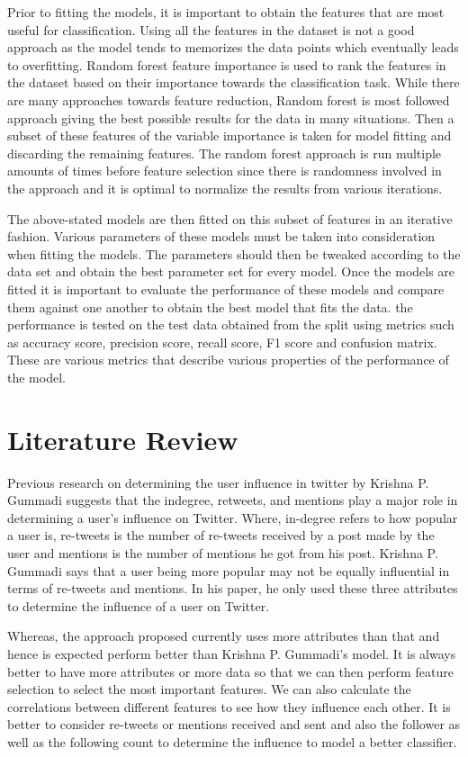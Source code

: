 \documentclass[sigconf]{acmart}
\begin{document}
Prior to fitting the models, it is important to obtain the features that are most useful for classification. Using all the features in the dataset is not a good approach as the model tends to memorizes the data points which eventually leads to overfitting. Random forest feature importance is used to rank the features in the dataset based on their importance towards the classification task. While there are many approaches towards feature reduction, Random forest is most followed approach giving the best possible results for the data in many situations. Then a subset of these features of the variable importance is taken for model fitting and discarding the remaining features. The random forest approach is run multiple amounts of times before feature selection since there is randomness involved in the approach and it is optimal to normalize the results from various iterations.

The above-stated models are then fitted on this subset of features in an iterative fashion. Various parameters of these models must be taken into consideration when fitting the models. The parameters should then be tweaked according to the data set and obtain the best parameter set for every model. Once the models are fitted it is important to evaluate the performance of these models and compare them against one another to obtain the best model that fits the data. the performance is tested on the test data obtained from the split using metrics such as accuracy score, precision score, recall score, F1 score and confusion matrix. These are various metrics that describe various properties of the performance of the model. 
\section{Literature Review}

Previous research on determining the user influence in twitter by Krishna P. Gummadi suggests that the indegree, retweets, and mentions play a major role in determining a user’s influence on Twitter. Where, in-degree refers to how popular a user is, re-tweets is the number of re-tweets received by a post made by the user and mentions is the number of mentions he got from his post. Krishna P. Gummadi says that a user being more popular may not be equally influential in terms of re-tweets and mentions. In his paper, he only used these three attributes to determine the influence of a user on Twitter.\cite{M2010}

Whereas, the approach proposed currently uses more attributes than that and hence is expected perform better than Krishna P. Gummadi’s model.  It is always better to have more attributes or more data so that we can then perform feature selection to select the most important features. We can also calculate the correlations between different features to see how they influence each other. It is better to consider re-tweets or mentions received and sent and also the follower as well as the following count to determine the influence to model a better classifier.\cite{M2010}
\end{document}
